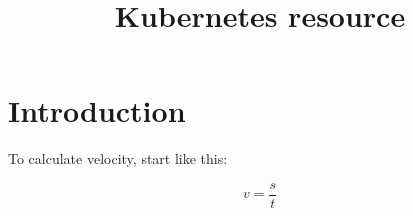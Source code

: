 \documentclass[1p, 12pt, times]{elsarticle}
\begin{document}
\begin{frontmatter}

\title{Kubernetes resource}



\end{frontmatter}

\section{Introduction}

To calculate velocity, start like this:

\begin{equation*}
v = \frac{s}{t}
\end{equation*}
\end{document}
